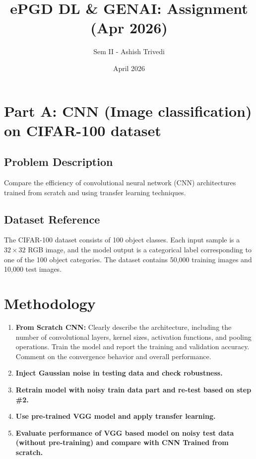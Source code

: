 \documentclass{article}
\title{ePGD DL \& GENAI: Assignment (Apr 2026)}
\author{Sem II - Ashish Trivedi}
\date{April 2026}
\begin{document}
\maketitle

\section*{Part A: CNN (Image classification) on CIFAR-100 dataset}

\subsection*{Problem Description}
Compare the efficiency of convolutional neural network (CNN) architectures trained from scratch and using transfer learning techniques.

\subsection*{Dataset Reference}
The CIFAR-100 dataset consists of 100 object classes. Each input sample is a $32 \times 32$ RGB image, and the model output is a categorical label corresponding to one of the 100 object categories. The dataset contains 50,000 training images and 10,000 test images.

\section*{Methodology}

\begin{enumerate}
    \item \textbf{From Scratch CNN:} Clearly describe the architecture, including the number of convolutional layers, kernel sizes, activation functions, and pooling operations. Train the model and report the training and validation accuracy. Comment on the convergence behavior and overall performance.
    \item \textbf{Inject Gaussian noise in testing data and check robustness.}
    \item \textbf{Retrain model with noisy train data part and re-test based on step \#2.}
    \item \textbf{Use pre-trained VGG model and apply transfer learning.}
    \item \textbf{Evaluate performance of VGG based model on noisy test data (without pre-training) and compare with CNN Trained from scratch.}
\end{enumerate}
\end{document}

